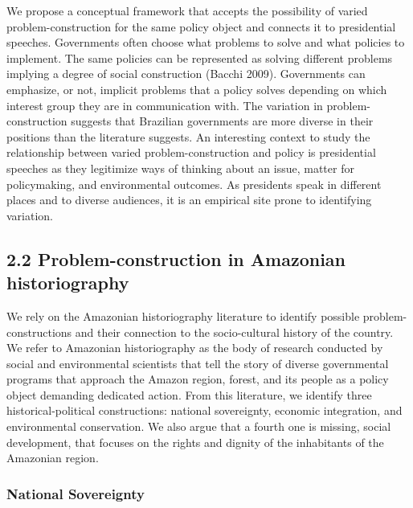 \documentclass[
  12pt,
]{article}
\begin{document}
We propose a conceptual framework that accepts the possibility of varied
problem-construction for the same policy object and connects it to
presidential speeches. Governments often choose what problems to solve
and what policies to implement. The same policies can be represented as
solving different problems implying a degree of social construction
(Bacchi 2009). Governments can emphasize, or not, implicit problems that
a policy solves depending on which interest group they are in
communication with. The variation in problem-construction suggests that
Brazilian governments are more diverse in their positions than the
literature suggests. An interesting context to study the relationship
between varied problem-construction and policy is presidential speeches
as they legitimize ways of thinking about an issue, matter for
policymaking, and environmental outcomes. As presidents speak in
different places and to diverse audiences, it is an empirical site prone
to identifying variation.

\hypertarget{problem-construction-in-amazonian-historiography}{%
\subsection{2.2 Problem-construction in Amazonian
historiography}\label{problem-construction-in-amazonian-historiography}}

We rely on the Amazonian historiography literature to identify possible
problem-constructions and their connection to the socio-cultural history
of the country. We refer to Amazonian historiography as the body of
research conducted by social and environmental scientists that tell the
story of diverse governmental programs that approach the Amazon region,
forest, and its people as a policy object demanding dedicated action.
From this literature, we identify three historical-political
constructions: national sovereignty, economic integration, and
environmental conservation. We also argue that a fourth one is missing,
social development, that focuses on the rights and dignity of the
inhabitants of the Amazonian region.

\hypertarget{national-sovereignty}{%
\subsubsection{National Sovereignty}\label{national-sovereignty}}
\end{document}
